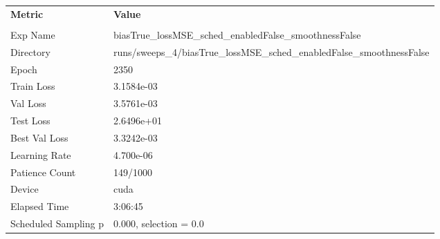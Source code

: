 \begin{tabular}{|l|l|}
\hline
\textbf{Metric} & \textbf{Value} \\\\
Exp Name & biasTrue_lossMSE_sched_enabledFalse_smoothnessFalse \\ 
Directory & runs/sweeps_4/biasTrue_lossMSE_sched_enabledFalse_smoothnessFalse \\ 
Epoch & 2350 \\ 
Train Loss & 3.1584e-03 \\ 
Val Loss & 3.5761e-03 \\ 
Test Loss & 2.6496e+01 \\ 
Best Val Loss & 3.3242e-03 \\ 
Learning Rate & 4.700e-06 \\ 
Patience Count & 149/1000 \\ 
Device & cuda \\ 
Elapsed Time & 3:06:45 \\ 
Scheduled Sampling p & 0.000, selection = 0.0 \\ 
\hline
\end{tabular}